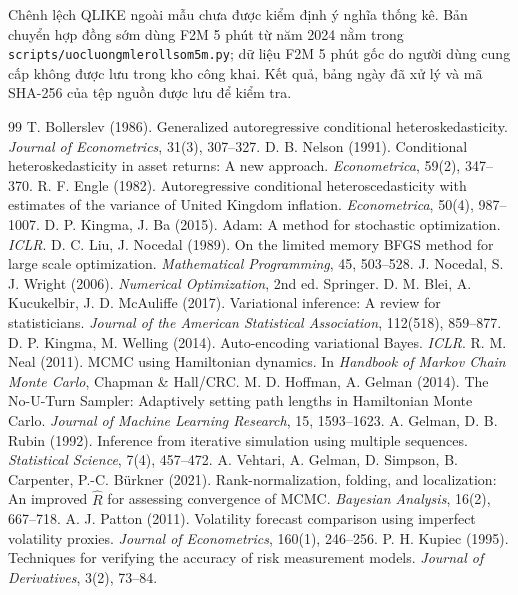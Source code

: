\documentclass[11pt,a4paper]{article}
\renewcommand{\_}{\gachduoi\allowbreak}
\newcommand{\tep}[1]{\texttt{#1}}
\begin{document}
Chênh lệch QLIKE ngoài mẫu chưa được kiểm định ý nghĩa thống kê. Bản chuyển
hợp đồng sớm dùng F2M 5 phút từ năm 2024 nằm trong
\tep{scripts/uoc\_luong\_mle\_roll\_som\_5m.py}; dữ liệu F2M 5 phút
gốc do người dùng cung cấp không được lưu trong kho công khai. Kết quả,
bảng ngày đã xử lý và mã SHA-256 của tệp nguồn được lưu để kiểm tra.

\begin{thebibliography}{99}\small
{} T. Bollerslev (1986). Generalized autoregressive conditional heteroskedasticity. \emph{Journal of Econometrics}, 31(3), 307--327.
 D. B. Nelson (1991). Conditional heteroskedasticity in asset returns: A new approach. \emph{Econometrica}, 59(2), 347--370.
 R. F. Engle (1982). Autoregressive conditional heteroscedasticity with estimates of the variance of United Kingdom inflation. \emph{Econometrica}, 50(4), 987--1007.
 D. P. Kingma, J. Ba (2015). Adam: A method for stochastic optimization. \emph{ICLR}.
 D. C. Liu, J. Nocedal (1989). On the limited memory BFGS method for large scale optimization. \emph{Mathematical Programming}, 45, 503--528.
 J. Nocedal, S. J. Wright (2006). \emph{Numerical Optimization}, 2nd ed. Springer.
 D. M. Blei, A. Kucukelbir, J. D. McAuliffe (2017). Variational inference: A review for statisticians. \emph{Journal of the American Statistical Association}, 112(518), 859--877.
 D. P. Kingma, M. Welling (2014). Auto-encoding variational Bayes. \emph{ICLR}.
 R. M. Neal (2011). MCMC using Hamiltonian dynamics. In \emph{Handbook of Markov Chain Monte Carlo}, Chapman \& Hall/CRC.
 M. D. Hoffman, A. Gelman (2014). The No-U-Turn Sampler: Adaptively setting path lengths in Hamiltonian Monte Carlo. \emph{Journal of Machine Learning Research}, 15, 1593--1623.
 A. Gelman, D. B. Rubin (1992). Inference from iterative simulation using multiple sequences. \emph{Statistical Science}, 7(4), 457--472.
 A. Vehtari, A. Gelman, D. Simpson, B. Carpenter, P.-C. Bürkner (2021). Rank-normalization, folding, and localization: An improved $\hat R$ for assessing convergence of MCMC. \emph{Bayesian Analysis}, 16(2), 667--718.
 A. J. Patton (2011). Volatility forecast comparison using imperfect volatility proxies. \emph{Journal of Econometrics}, 160(1), 246--256.
 P. H. Kupiec (1995). Techniques for verifying the accuracy of risk measurement models. \emph{Journal of Derivatives}, 3(2), 73--84.

\end{thebibliography}
\end{document}
